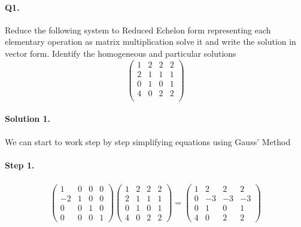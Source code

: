 \documentclass[11pt]{article}
\begin{document}
\pagestyle{myheadings}

\paragraph{Q1.}Reduce the following system to Reduced Echelon form representing each elementary operation as matrix multiplication solve it and write the solution in vector form. Identify the homogeneous and particular solutions
\[
\left(\begin{array}{ccc|c}  
	1 & 2 & 2 & 2\\
    2 & 1 & 1 & 1\\
    0 & 1 & 0 & 1\\
    4 & 0 & 2 & 2\\
\end{array}\right)
\]

\paragraph{Solution 1.}We can start to work step by step simplifying equations using Gauss' Method
\paragraph{Step 1.}
\begin{eqnarray*}
\begin{pmatrix}
	1 & 0 & 0 & 0\\
	-2 & 1 & 0 & 0\\
	0 & 0 & 1 & 0\\
	0 & 0 & 0 & 1
\end{pmatrix}
\left(\begin{array}{ccc|c}  
	1 & 2 & 2 & 2\\
    2 & 1 & 1 & 1\\
    0 & 1 & 0 & 1\\
    4 & 0 & 2 & 2
\end{array}\right)
=
\left(\begin{array}{ccc|c}  
	1 & 2 & 2 & 2\\
    0 & -3 & -3 & -3\\
    0 & 1 & 0 & 1\\
    4 & 0 & 2 & 2
\end{array}\right)
\end{eqnarray*}
\end{document}
